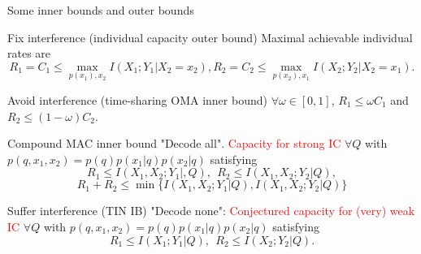 \documentclass[aspectratio=43, 10pt]{beamer}
\begin{document}
    \begin{frame}{Some inner bounds and outer bounds}
        \vspace{-1em}
        \small
        \begin{block}{Fix interference (individual capacity outer bound)}
            Maximal achievable individual rates are 
            $$R_1=C_1\leq \max_{p(x_1),x_2}I(X_1;Y_1|X_2=x_2), R_2=C_2\leq \max_{p(x_2),x_1}I(X_2;Y_2|X_2=x_1).$$
        \end{block}

        \vspace{-1em}
        \begin{block}{Avoid interference (time-sharing OMA inner bound)}
            $\forall \omega \in[0,1]$, $R_1 \leq \omega C_1$ and $R_2 \leq (1-\omega) C_2$. 
        \end{block}

        \vspace{-1em}
        \begin{block}{Compound MAC inner bound "Decode all". \textcolor{red}{Capacity for strong IC}}
            $\forall Q $ with $p(q,x_1,x_2) = p(q)p(x_1|q)p(x_2|q)$ satisfying 
            $$R_1 \leq I(X_1,X_2;Y_1|,Q), ~~R_2 \leq I(X_1,X_2;Y_2|Q), $$
            $$R_1 + R_2 \leq \min\{ I(X_1,X_2;Y_1|Q), I(X_1,X_2;Y_2|Q)  \}$$
        \end{block}
                
        \vspace{-0.5em}
        \begin{block}{Suffer interference (TIN IB) "Decode none": \textcolor{red}{Conjectured capacity for (very) weak IC}}
            $\forall Q $ with $p(q,x_1,x_2) = p(q)p(x_1|q)p(x_2|q)$ satisfying 
            $$R_1 \leq I(X_1;Y_1|Q), ~~R_2 \leq I(X_2;Y_2|Q). $$ 
        \end{block}
    \end{frame}
\end{document}
